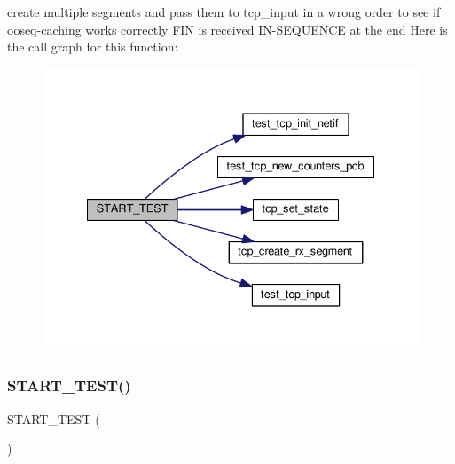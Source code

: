 create multiple segments and pass them to tcp\+\_\+input in a wrong order to see if ooseq-\/caching works correctly F\+IN is received I\+N-\/\+S\+E\+Q\+U\+E\+N\+CE at the end Here is the call graph for this function\+:
\nopagebreak
\begin{figure}[H]
\begin{center}
\leavevmode
\includegraphics[width=335pt]{openmote-cc2538_2lwip_2test_2unit_2tcp_2test__tcp__oos_8c_a2b7dd8bafcdb6590e1594a1cc1888173_cgraph}
\end{center}
\end{figure}
\mbox{\label{openmote-cc2538_2lwip_2test_2unit_2tcp_2test__tcp__oos_8c_a3bdbf082f49839e7207ed367d43e7718}} 
\subsubsection{\texorpdfstring{S\+T\+A\+R\+T\+\_\+\+T\+E\+S\+T()}{START\_TEST()}\hspace{0.1cm}{\footnotesize\ttfamily [3/6]}}
{\footnotesize\ttfamily S\+T\+A\+R\+T\+\_\+\+T\+E\+ST (\begin{DoxyParamCaption}\item[{test\+\_\+tcp\+\_\+recv\+\_\+ooseq\+\_\+overrun\+\_\+rxwin}]{ }\end{DoxyParamCaption})}

